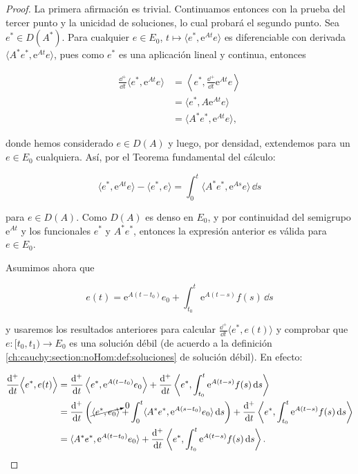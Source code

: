 \begin{proof}
    La primera afirmación es trivial. Continuamos entonces con la prueba del tercer punto y la unicidad de soluciones, lo cual probará el segundo punto. Sea $e^* \in D(A^*)$. Para cualquier $e \in E_0$, $t \mapsto \langle e^*, \mathrm{e}^{At}e \rangle$ es diferenciable con derivada $\langle A^*e^*, \mathrm{e}^{At}e \rangle$, pues como $e^*$ es una aplicación lineal y continua, entonces

    \begin{align*}
        \frac{\dd^+}{\dd t}\langle e^*, \mathrm{e}^{At}e \rangle &= \left \langle e^*, \frac{\dd^+}{\dd t}\mathrm{e}^{At}e \right \rangle\\
        &= \langle e^*, A\mathrm{e}^{At}e \rangle\\
        &= \langle A^* e^*, \mathrm{e}^{At}e \rangle,
    \end{align*}

    donde hemos considerado $e \in D(A)$ y luego, por densidad, extendemos para un $e \in E_0$ cualquiera. Así, por el Teorema fundamental del cálculo:

    \[\langle e^*, \mathrm{e}^{At}e \rangle - \langle e^*, e \rangle = \int_0^t \langle A^* e^*, \mathrm{e}^{As}e \rangle \, \dd s\]

    para $e \in D(A)$. Como $D(A)$ es denso en $E_0$, y por continuidad del semigrupo $\mathrm{e}^{At}$ y los funcionales $e^*$ y $A^*e^*$, entonces la expresión anterior es válida para $e \in E_0$.\footnotemark

    Asumimos ahora que
    
    \[e(t) = \mathrm{e}^{A(t-t_0)}e_0 + \int_{t_0}^{t} \mathrm{e}^{A(t-s)}f(s)\, \dd s\]
    
    y usaremos los resultados anteriores para calcular $\displaystyle\frac{\dd^+}{\dd t}\langle e^*, e(t) \rangle$ y comprobar que $e : [t_0, t_1) \rightarrow E_0$ es una solución débil (de acuerdo a la definición \eqref{ch:cauchy:section:noHom:def:soluciones} de solución débil). En efecto:

    \begin{align*}
        \frac{\mathrm{d}^+}{\mathrm{d} t} \Big \langle e^*, e(t) \Big \rangle &= \frac{\mathrm{d}^+}{\mathrm{d} t} \left \langle e^*, \mathrm{e}^{A(t-t_0)}e_0 \right \rangle + \frac{\mathrm{d}^+}{\mathrm{d} t}\left \langle e^*, \int_{t_0}^t \mathrm{e}^{A(t-s)}f(s) \, \mathrm{d} s \right \rangle\\
        &=\frac{\mathrm{d}^+}{\mathrm{d} t} \left( \cancelto{0}{\langle e^*, e_0 \rangle} + \int_0^t \langle A^* e^*, \mathrm{e}^{A(s-t_0)}e_0 \rangle \, \mathrm{d} s \right) + \frac{\mathrm{d}^+}{\mathrm{d} t}\left \langle e^*, \int_{t_0}^t \mathrm{e}^{A(t-s)}f(s) \, \mathrm{d} s \right \rangle\\
        &=\langle A^* e^*, \mathrm{e}^{A(t-t_0)}e_0 \rangle + \frac{\mathrm{d}^+}{\mathrm{d} t}\left \langle e^*, \int_{t_0}^t \mathrm{e}^{A(t-s)}f(s) \, \mathrm{d} s \right \rangle.
    \end{align*}


\end{proof}
